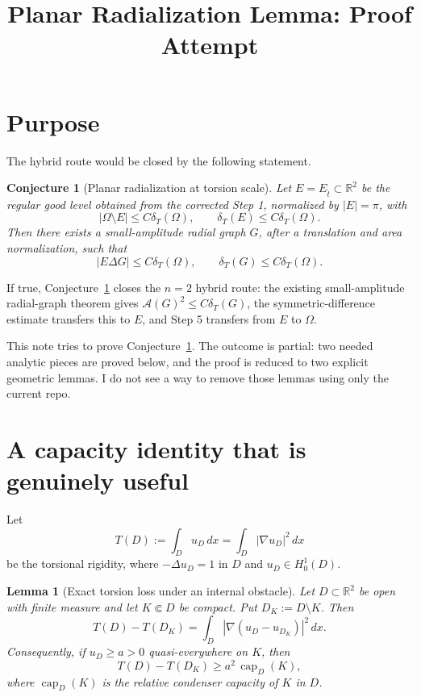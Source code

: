 \documentclass[11pt]{article}
\title{Planar Radialization Lemma: Proof Attempt}
\author{}
\date{}
\newtheorem{lemma}[theorem]{Lemma}
\newtheorem{conjecture}[theorem]{Conjecture}
\newcommand{\R}{\mathbb R}
\newcommand{\dT}{\delta_T}
\newcommand{\A}{\mathcal A}
\newcommand{\capr}{\operatorname{cap}}
\begin{document}
\maketitle

\section{Purpose}

The hybrid route would be closed by the following statement.

\begin{conjecture}[Planar radialization at torsion scale]
\label{conj:rad}
Let \(E=E_{\hat t}\subset\R^2\) be the regular good level obtained from
the corrected Step 1, normalized by \(|E|=\pi\), with
\[
   |\Omega\setminus E|\le C\dT(\Omega),
   \qquad
   \dT(E)\le C\dT(\Omega).
\]
Then there exists a small-amplitude radial graph \(G\), after a
translation and area normalization, such that
\[
   |E\Delta G|\le C\dT(\Omega),
   \qquad
   \dT(G)\le C\dT(\Omega).
   \tag{R}
\]
\end{conjecture}

If true, Conjecture~\ref{conj:rad} closes the \(n=2\) hybrid route:
the existing small-amplitude radial-graph theorem gives
\(\A(G)^2\le C\dT(G)\), the symmetric-difference estimate transfers this
to \(E\), and Step 5 transfers from \(E\) to \(\Omega\).

This note tries to prove Conjecture~\ref{conj:rad}.  The outcome is
partial: two needed analytic pieces are proved below, and the proof is
reduced to two explicit geometric lemmas.  I do not see a way to remove
those lemmas using only the current repo.

\section{A capacity identity that is genuinely useful}

Let
\[
   T(D):=\int_D u_D\,dx=\int_D|\nabla u_D|^2\,dx
\]
be the torsional rigidity, where \(-\Delta u_D=1\) in \(D\) and
\(u_D\in H^1_0(D)\).

\begin{lemma}[Exact torsion loss under an internal obstacle]
\label{lem:caploss}
Let \(D\subset\R^2\) be open with finite measure and let
\(K\Subset D\) be compact.  Put \(D_K:=D\setminus K\).  Then
\[
   T(D)-T(D_K)
      =\int_D |\nabla(u_D-u_{D_K})|^2\,dx .
   \tag{2.1}
\]
Consequently, if \(u_D\ge a>0\) quasi-everywhere on \(K\), then
\[
   T(D)-T(D_K)\ge a^2\,\capr_D(K),
   \tag{2.2}
\]
where \(\capr_D(K)\) is the relative condenser capacity of \(K\) in \(D\).
\end{lemma}
\end{document}
